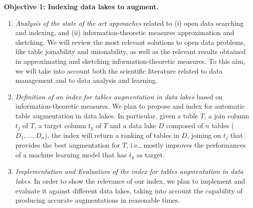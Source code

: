 \noindent\textbf{Objective 1: Indexing data lakes to augment.}
\begin{enumerate}
    \item \textit{Analysis of the state of the art approaches} related to (i) open data searching and indexing, and (ii) information-theoretic measures approximation and sketching. We will review the most relevant solutions to open data problems, like table joinability and unionability, as well as the relevant results obtained in approximating and sketching information-theoretic measures. To this aim, we will take into account both the scientific literature related to data management and to data analysis and learning.
    \item \textit{Definition of an index for tables augmentation in data lakes} based on information-theoretic measures. We plan to propose and index for automatic table augmentation in data lakes. In particular, given a table $T$, a join column $t_j$ of $T$, a target column $t_y$ of $T$ and a data lake $D$ composed of $n$ tables ($D_1,...,D_n$), the index will return a ranking of tables in $D$, joining on $t_j$ that provides the best augmentation for $T$, i.e., mostly improves the performances of a machine learning model that has $t_y$ as target.
    \item \textit{Implementation and Evaluation of the index for tables augmentation in data lakes}. In order to show the relevance of our index, we plan to implement and evaluate it against different data lakes, taking into account the capability of producing accurate augmentations in reasonable times.
\end{enumerate}

